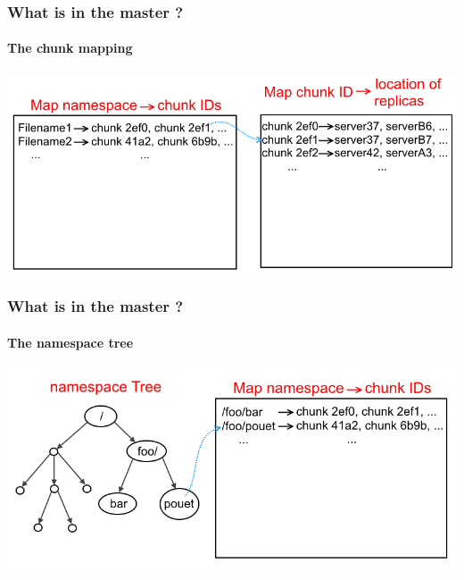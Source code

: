 \documentclass{beamer}
\begin{document}
\begin{frame}
 \frametitle{What is in the master ?}
 \framesubtitle{The chunk mapping}
 \centering
 \includegraphics[height=\masterpicheight]{figures/namespaceMapMapschema.png}
\end{frame}

\begin{frame}
 \frametitle{What is in the master ?}
 \framesubtitle{The namespace tree}
 \centering
 \includegraphics[height=\masterpicheight]{figures/namespaceTreeMapschema.png}
\end{frame}
\end{document}
